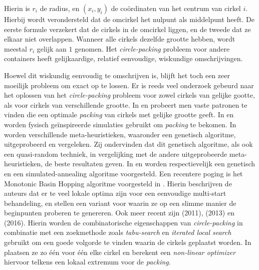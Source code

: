 \documentclass[12pt,a4paper,oneside]{book}
\begin{document}
Hierin is $r_i$ de radius, en $(x_i,y_i)$ de coördinaten van het centrum van cirkel $i$.
Hierbij wordt verondersteld dat de omcirkel het nulpunt als middelpunt heeft.
De eerste formule verzekert dat de cirkels in de omcirkel liggen, en de tweede dat ze elkaar niet overlappen.
Wanneer alle cirkels dezelfde grootte hebben, wordt meestal $r_i$ gelijk aan $1$ genomen.
Het \textit{circle-packing} probleem voor andere containers heeft gelijkaardige, relatief eenvoudige, wiskundige omschrijvingen.

Hoewel dit wiskundig eenvoudig te omschrijven is, blijft het toch een zeer moeilijk probleem om exact op te lossen.
Er is reeds veel onderzoek gebeurd naar het oplossen van het \textit{circle-packing} probleem voor zowel cirkels van gelijke gootte, als voor cirkels van verschillende grootte.
In \cite{graham1996repeated} en \cite{lubachevsky1997curved} probeert men vaste patronen te vinden die een optimale \textit{packing} van cirkels met gelijke grootte geeft.
In \cite{graham1998dense} en \cite{wang2002improved} worden fysisch geïnspireerde simulaties gebruikt om \textit{packing} te bekomen.
In \cite{george1995packing} worden verschillende meta-heuristieken, waaronder een genetisch algoritme, uitgeprobeerd en vergeleken.
Zij ondervinden dat dit genetisch algoritme, als ook een quasi-random techniek, in vergelijking met de andere uitgeprobeerde meta-heuristieken, de beste resultaten geven.
In \cite{hifi2004approximate} en \cite{hifi2004simulated} worden respectievelijk een genetisch en een simulated-annealing algoritme voorgesteld.
Een recentere poging is het Monotonic Basin Hopping algoritme voorgesteld in \cite{grosso2010}.
Hierin beschrijven de auteurs dat er te veel lokale optima zijn voor een eenvoudige multi-start behandeling, en stellen een variant voor waarin ze op een slimme manier de beginpunten proberen te genereren.
Ook meer recent zijn \cite{jors2011} (2011), \cite{ye2013iterated} (2013) en \cite{zeng2016iterated} (2016).
Hierin worden de combinatorische eigenschappen van \textit{circle-packing} in combinatie met een zoekmethode zoals \textit{tabu-search} en \textit{iterated local search} gebruikt om een goede volgorde te vinden waarin de cirkels geplaatst worden.
In \cite{jors2011} plaatsen ze zo één voor één elke cirkel en berekent een \textit{non-linear optimizer} hiervoor telkens een lokaal extremum voor de \textit{packing}.
\end{document}
